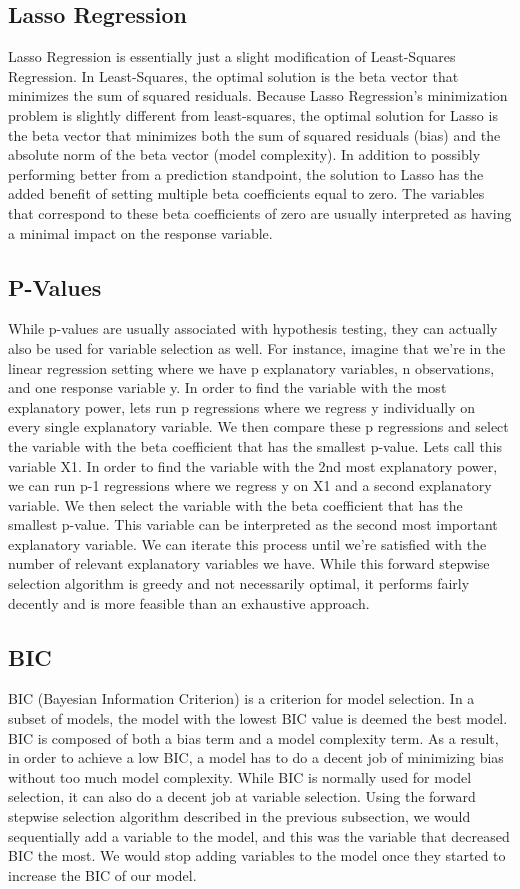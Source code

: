 \documentclass{article}
\begin{document}
\subsection{Lasso Regression}
Lasso Regression is essentially just a slight modification of Least-Squares Regression. In Least-Squares, the optimal solution is the beta vector that minimizes the sum of squared residuals. Because Lasso Regression's minimization problem is slightly different from least-squares, the optimal solution for Lasso is the beta vector that minimizes both the sum of squared residuals (bias) and the absolute norm of the beta vector (model complexity). In addition to possibly performing better from a prediction standpoint, the solution to Lasso has the added benefit of setting multiple beta coefficients equal to zero. The variables that correspond to these beta coefficients of zero are usually interpreted as having a minimal impact on the response variable.

\subsection{P-Values}
While p-values are usually associated with hypothesis testing, they can actually also be used for variable selection as well. For instance, imagine that we're in the linear regression setting where we have p explanatory variables, n observations, and one response variable y. In order to find the variable with the most explanatory power, lets run p regressions where we regress y individually on every single explanatory variable. We then compare these p regressions and select the variable with the beta coefficient that has the smallest p-value. Lets call this variable X1. In order to find the variable with the 2nd most explanatory power, we can run p-1 regressions where we regress y on X1 and a second explanatory variable. We then select the variable with the beta coefficient that has the smallest p-value. This variable can be interpreted as the second most important explanatory variable. We can iterate this process until we're satisfied with the number of relevant explanatory variables we have. While this forward stepwise selection algorithm is greedy and not necessarily optimal, it performs fairly decently and is more feasible than an exhaustive approach.

\subsection{BIC}
BIC (Bayesian Information Criterion) is a criterion for model selection. In a subset of models, the model with the lowest BIC value is deemed the best model. BIC is composed of both a bias term and a model complexity term. As a result, in order to achieve a low BIC, a model has to do a decent job of minimizing bias without too much model complexity. While BIC is normally used for model selection, it can also do a decent job at variable selection. Using the forward stepwise selection algorithm
described in the previous subsection, we would sequentially add a variable to the model, and this was the variable that decreased BIC the most. We would stop adding variables to the model once they started to increase the BIC of our model.
\end{document}
